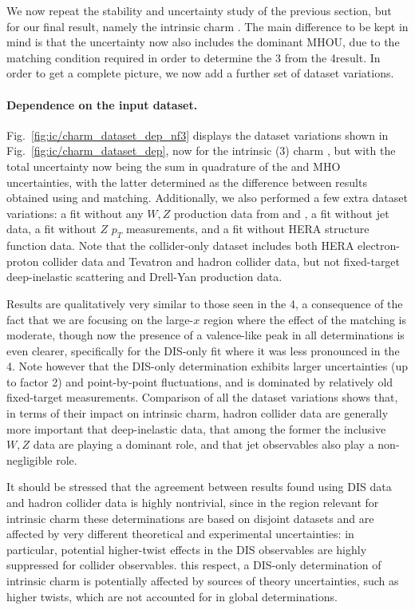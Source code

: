 
We now repeat the stability and uncertainty
study of the previous section, but for our final
result, namely the intrinsic charm \pdf. The main difference to be kept
in mind is that the uncertainty now also includes the dominant MHOU,
due to the matching condition required in order to determine the 3\fns
\pdf from the 4\fns result. In order to get a complete picture, we now
add a further set of dataset variations.

\paragraph{Dependence on the input dataset.}
%
Fig.~\ref{fig:ic/charm_dataset_dep_nf3} displays the dataset variations shown in
Fig.~\ref{fig:ic/charm_dataset_dep}, now for the intrinsic (3\fns) charm
\pdf, but with the total uncertainty now being the sum in quadrature of
the \pdf and MHO uncertainties, with the latter determined as the difference between
results obtained using \nnlo and \nnnlo matching.
%
Additionally, we also performed a few extra  dataset
variations: a fit without any $W, Z$ production data from \atlas and \cms,
a fit without jet data, a fit without $Z$ $p_T$ measurements, and a fit without
HERA structure function data.
%
Note that the collider-only dataset includes both HERA electron-proton
collider data and Tevatron and \lhc hadron collider data, but not
fixed-target deep-inelastic scattering and Drell-Yan production data.


Results are qualitatively very similar to those seen in the 4\fns, a
consequence of the fact that we are focusing on the large-$x$ region where the
effect of the matching is moderate, though now the presence of a
valence-like peak in all determinations is even clearer, specifically
for the DIS-only fit where it was less pronounced in the 4\fns.
%
 Note however that the DIS-only determination
  exhibits larger uncertainties
  (up to factor 2) and point-by-point fluctuations,
  and is dominated by relatively old fixed-target measurements.
%
Comparison of all the dataset variations shows that, in terms of their
impact on intrinsic charm,
hadron collider data are generally more important
that deep-inelastic data, that among the former the
\lhcb inclusive $W,Z$ data are playing a dominant role,
and that jet observables also play a non-negligible role.

It should be stressed that the agreement between results found using
DIS data and hadron collider data is highly nontrivial, since in the region
relevant for intrinsic charm these determinations are based on disjoint datasets
and are  affected by
very different theoretical and experimental uncertainties:
in particular, potential higher-twist
effects in the DIS observables are highly suppressed for collider observables.
%
 this respect, a DIS-only determination of intrinsic charm
  is potentially affected by sources of theory uncertainties, such as higher twists,
which are not accounted for in global \pdf determinations.

